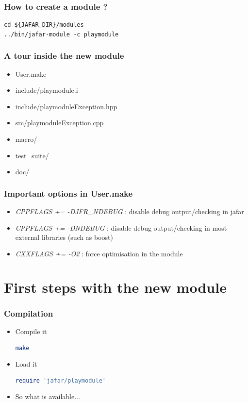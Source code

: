 \documentclass[compress]{beamer}
\begin{document}
\begin{frame}[fragile]
  \frametitle{How to create a module ?}
  \begin{lstlisting}
cd ${JAFAR_DIR}/modules
../bin/jafar-module -c playmodule
  \end{lstlisting}
\end{frame}

\begin{frame}
  \frametitle{A tour inside the new module}
  \begin{itemize}
   \item<1-> User.make
   \item<2-> include/playmodule.i
   \item<3-> include/playmoduleException.hpp
   \item<4-> src/playmoduleException.cpp
   \item<5-> macro/
   \item<6-> test\_suite/
   \item<7-> doc/
  \end{itemize}
\end{frame}

\begin{frame}
  \frametitle{Important options in User.make}
  \begin{itemize}
   \item<1-> \textit{CPPFLAGS += -DJFR\_NDEBUG} : disable debug output/checking
in jafar
   \item<2-> \textit{CPPFLAGS += -DNDEBUG} : disable debug output/checking
in most external libraries (such as boost)
   \item<3-> \textit{CXXFLAGS += -O2} : force optimisation in the module
  \end{itemize}
\end{frame}


\section{First steps with the new module}
\begin{frame}[fragile]
  \frametitle{Compilation}
  \begin{itemize}
    \item<1-> Compile it
      \begin{lstlisting}[language=bash]
make
      \end{lstlisting}
    \item<2-> Load it
      \begin{lstlisting}[language=ruby]
require 'jafar/playmodule'
      \end{lstlisting}
    \item<3-> So what is available...
  \end{itemize}
\end{frame}
\end{document}
